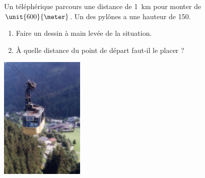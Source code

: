 
\begin{exercice}\label{exo2smath-0152}

    \begin{multicols}{2}
    Un téléphérique parcours une distance de \SI{1}{\kilo\meter} pour monter de \( \unit{600}{\meter}\). Un des pylônes a une hauteur de \unit{150}{\meter}.
    \begin{enumerate}
        \item
            Faire un dessin à main levée de la situation.
        \item
    À quelle distance du point de départ faut-il le placer ?
    \end{enumerate}

    \columnbreak
    \includegraphics[width=4cm]{telepherique.pdf}
    \end{multicols}

\end{exercice}
